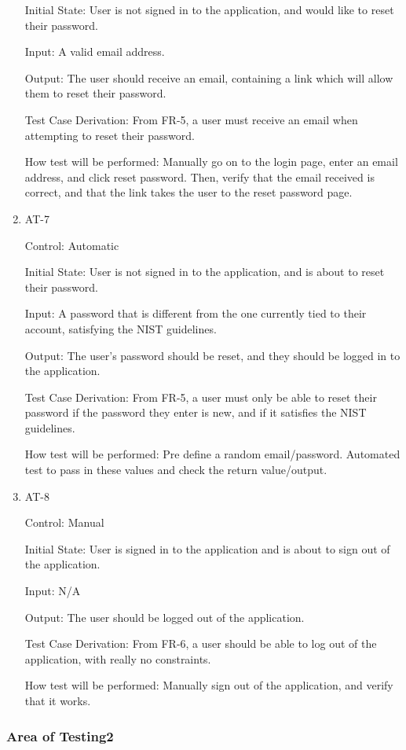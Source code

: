 \documentclass[12pt, titlepage]{article}
\begin{document}
\begin{enumerate}
Initial State: User is not signed in to the application, and would like to reset their password.
					
Input: A valid email address.
					
Output: The user should receive an email, containing a link which will allow them to reset their password.

Test Case Derivation: From FR-5, a user must receive an email when attempting to reset their password.

How test will be performed: Manually go on to the login page, enter an email address, and click reset password. Then, verify
that the email received is correct, and that the link takes the user to the reset password page.


\item{AT-7}

Control: Automatic
					
Initial State: User is not signed in to the application, and is about to reset their password.
					
Input: A password that is different from the one currently tied to their account, satisfying the NIST guidelines.
					
Output: The user's password should be reset, and they should be logged in to the application.

Test Case Derivation: From FR-5, a user must only be able to reset their password if the password they enter is new, and if it 
satisfies the NIST guidelines.

How test will be performed: Pre define a random email/password. Automated test to pass in these values and check the return value/output.

\item{AT-8}

Control: Manual
					
Initial State: User is signed in to the application and is about to sign out of the application.
					
Input: N/A
					
Output: The user should be logged out of the application.

Test Case Derivation: From FR-6, a user should be able to log out of the application, with really no constraints.

How test will be performed: Manually sign out of the application, and verify that it works.


\end{enumerate}

\subsubsection{Area of Testing2}
\end{document}
